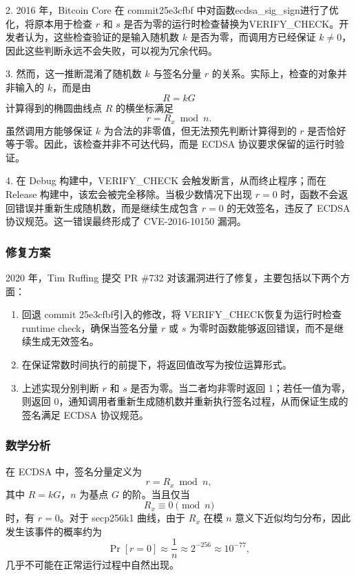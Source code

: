 \documentclass[a4paper,12pt]{ctexart}
\begin{document}
2. 2016 年，Bitcoin Core 在 commit25e3cfbf 中对函数ecdsa\_sig\_sign进行了优化，将原本用于检查 $r$ 和 $s$ 是否为零的运行时检查替换为VERIFY\_CHECK。开发者认为，这些检查验证的是输入随机数 $k$ 是否为零，而调用方已经保证 $k\neq0$，因此这些判断永远不会失败，可以视为冗余代码。

3. 然而，这一推断混淆了随机数 $k$ 与签名分量 $r$ 的关系。实际上，检查的对象并非输入的 $k$，而是由
\[
R = kG
\]
计算得到的椭圆曲线点 $R$ 的横坐标满足
\[
r = R_x \bmod n.
\]
虽然调用方能够保证 $k$ 为合法的非零值，但无法预先判断计算得到的 $r$ 是否恰好等于零。因此，该检查并非不可达代码，而是 ECDSA 协议要求保留的运行时验证。

4. 在 Debug 构建中，VERIFY\_CHECK 会触发断言，从而终止程序；而在 Release 构建中，该宏会被完全移除。当极少数情况下出现 $r=0$ 时，函数不会返回错误并重新生成随机数，而是继续生成包含 $r=0$ 的无效签名，违反了 ECDSA 协议规范。这一错误最终形成了 CVE-2016-10150 漏洞。
\subsubsection{修复方案}

2020 年，Tim Ruffing 提交 PR \#732 对该漏洞进行了修复，主要包括以下两个方面：

\begin{enumerate}[leftmargin=*]
    \item 回退 commit 25e3cfbf引入的修改，将 VERIFY\_CHECK恢复为运行时检查runtime check，确保当签名分量 $r$ 或 $s$ 为零时函数能够返回错误，而不是继续生成无效签名。
    \item 在保证常数时间执行的前提下，将返回值改写为按位运算形式。
    \item 上述实现分别判断 $r$ 和 $s$ 是否为零。当二者均非零时返回 1；若任一值为零，则返回 0，通知调用者重新生成随机数并重新执行签名过程，从而保证生成的签名满足 ECDSA 协议规范。

\end{enumerate}



\subsubsection{数学分析}

在 ECDSA 中，签名分量定义为
\[
r = R_x \bmod n,
\]
其中 $R=kG$，$n$ 为基点 $G$ 的阶。当且仅当
\[
R_x \equiv 0 \pmod n
\]
时，有 $r=0$。对于 secp256k1 曲线，由于 $R_x$ 在模 $n$ 意义下近似均匀分布，因此发生该事件的概率约为
\[
\Pr[r=0]\approx\frac{1}{n}\approx2^{-256}\approx10^{-77},
\]
几乎不可能在正常运行过程中自然出现。
\end{document}
